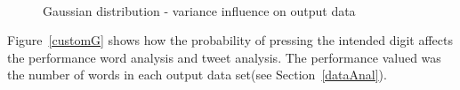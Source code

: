 \documentclass[12pt]{article}
\begin{document}
\begin{figure}[!htbp]
\centering
{} \hspace{35pt}
 \\
\caption{Gaussian distribution - variance influence on output data}
\label{gaussG}
\end{figure}

Figure~\ref{customG} shows how the probability of pressing the intended digit
affects the performance word analysis and tweet analysis. The
performance valued was the number of words in each output data set(see
Section~\ref{dataAnal}).
\end{document}
